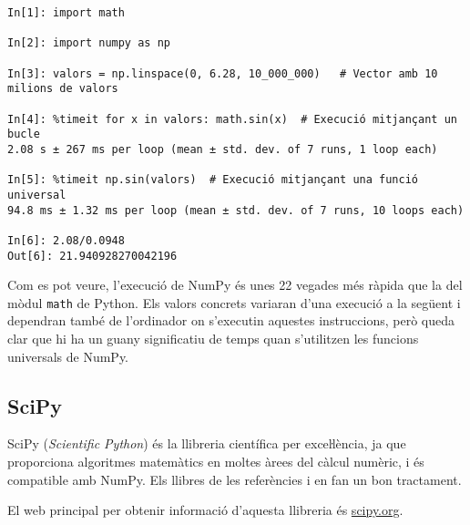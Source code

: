 \begin{lstlisting}
In[1]: import math

In[2]: import numpy as np

In[3]: valors = np.linspace(0, 6.28, 10_000_000)   # Vector amb 10 milions de valors

In[4]: %timeit for x in valors: math.sin(x)  # Execució mitjançant un bucle
2.08 s ± 267 ms per loop (mean ± std. dev. of 7 runs, 1 loop each)

In[5]: %timeit np.sin(valors)  # Execució mitjançant una funció universal
94.8 ms ± 1.32 ms per loop (mean ± std. dev. of 7 runs, 10 loops each)

In[6]: 2.08/0.0948
Out[6]: 21.940928270042196
\end{lstlisting}

Com es pot veure, l'execució de NumPy és unes 22 vegades més ràpida que la del mòdul \texttt{math} de Python. Els valors concrets variaran d'una execució a la següent i dependran també de l'ordinador on s'executin aquestes instruccions, però queda clar que hi ha un guany significatiu de temps quan s'utilitzen les funcions universals de NumPy.


\subsection{SciPy}

SciPy (\textit{Scientific Python}) és la llibreria científica per exceŀlència, ja que proporciona algoritmes  matemàtics en moltes àrees del càlcul numèric, i és compatible amb NumPy. Els llibres de les referències \cite{JOH} i \cite{HIL} en fan un bon tractament.

El  web principal per obtenir informació d'aquesta llibreria és \href{https://scipy.org/}{scipy.org}.

